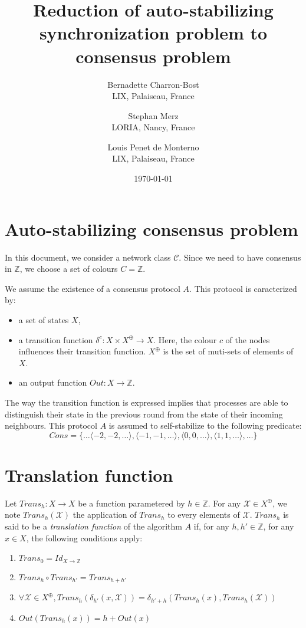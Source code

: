 \documentclass[11pt,letterpaper]{article}
\title{Reduction of auto-stabilizing synchronization problem to consensus problem}
\author{
	Bernadette Charron-Bost \\
	LIX, Palaiseau, France
\and
	Stephan Merz \\
	LORIA, Nancy, France
\and
	Louis Penet de Monterno \\
	LIX, Palaiseau, France
}
\date{\today}
\begin{document}
  \maketitle

\section{Auto-stabilizing consensus problem}

In this document, we consider a network class $\mathcal{C}$.
Since we need to have consensus in $\mathds{Z}$, we choose a set of colours $C = \mathds{Z}$.

We assume the existence of a consensus protocol $A$.
This protocol is caracterized by:
\begin{itemize}
	\item a set of states $X$,
	\item a transition function $\delta^c : X \times X^\oplus \rightarrow X$. Here, the colour $c$ of the nodes influences their transition function.
		$X^\oplus$ is the set of muti-sets of elements of $X$.
	\item an output function $Out : X \rightarrow \mathds{Z}$.
\end{itemize}

The way the transition function is expressed implies that processes are able to distinguish their state in the previous round from the state of their incoming neighbours.
This protocol $A$ is assumed to self-stabilize to the following predicate:
$$Cons = \{\dots \langle -2,-2,\dots \rangle, \langle -1,-1,\dots \rangle, \langle 0,0,\dots \rangle, \langle 1,1,\dots \rangle, \dots\}$$


\section{Translation function}

Let $Trans_h : X \rightarrow X$ be a function parametered by $h \in \mathds{Z}$.
For any $\mathcal{X} \in X^\oplus$, we note $Trans_h(\mathcal{X})$ the application of $Trans_h$ to every elements of $\mathcal{X}$.
$Trans_h$ is said to be a \textit{translation function} of the algorithm $A$ if, for any $h, h' \in \mathds{Z}$, for any $x \in X$, the following conditions apply:
\begin{enumerate}
	\item $Trans_0 = Id_{X \rightarrow \mathds{Z}}$
	\item $Trans_h \circ Trans_{h'} = Trans_{h+h'}$
	\item $\forall \mathcal{X} \in X^\oplus, Trans_h(\delta_{h'}(x, \mathcal{X})) = \delta_{h'+h}(Trans_h(x), Trans_h(\mathcal{X}))$
	\item $Out(Trans_h(x)) = h+Out(x)$
\end{enumerate}
\end{document}
